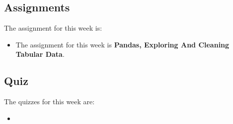\subsection{Assignments}

The assignment for this week is:

\begin{itemize}
    \item The assignment for this week is \textbf{Pandas, Exploring And Cleaning Tabular Data}. 
\end{itemize}

\subsection{Quiz}

The quizzes for this week are:

\begin{itemize}
    \item {} \textbullet {} 
\end{itemize}
